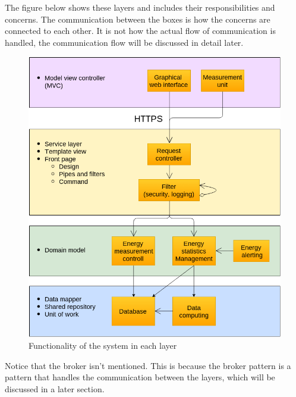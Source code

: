 The figure below shows these layers and includes their responsibilities and concerns. The communication between the boxes is how the concerns are connected to each other. It is not how the actual flow of communication is handled, the communication flow will be discussed in detail later.

\begin{figure}[H]
\centering
\includegraphics[scale=0.7]{7-software/images/layersflow.png}
\caption{Functionality of the system in each layer}
\label{fig:layersflow}
\end{figure}

Notice that the broker isn't mentioned. This is because the broker pattern is a pattern that handles the communication between the layers, which will be discussed in a later section.

\clearpage

